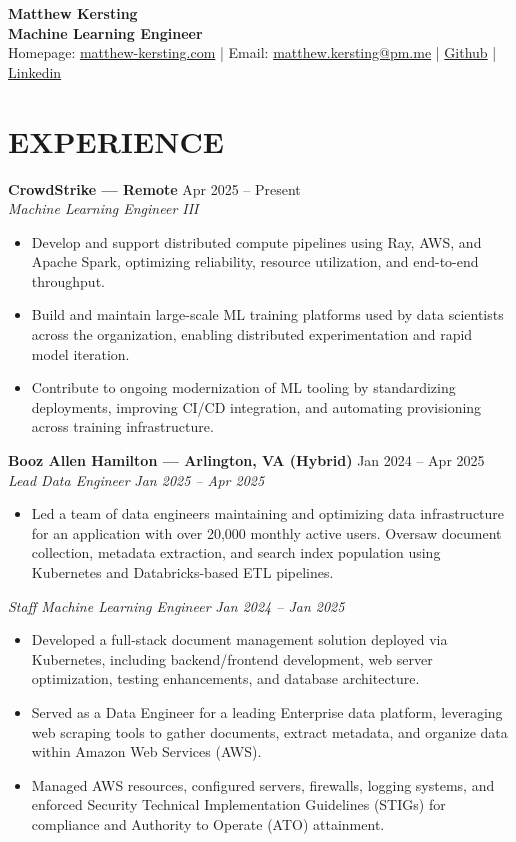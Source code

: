 \documentclass[10pt, letterpaper]{article}
\newcommand{\company}[2]{\textbf{#1} \hfill #2 \\[-1pt]}
\newcommand{\role}[1]{\textit{#1}}
\newcommand{\rolespan}[2]{\textit{#1} \hfill \textit{#2}}
\begin{document}
{\LARGE\textbf{Matthew Kersting}} \\[1pt]
\textbf{Machine Learning Engineer} \\[4pt]
Homepage: \href{https://matthew-kersting.com}{matthew-kersting.com} \quad|\quad
Email: \href{mailto:matthew.kersting@pm.me}{matthew.kersting@pm.me} \quad|\quad
\href{https://github.com/matthew-kersting}{Github} \quad|\quad
\href{https://www.linkedin.com/in/matthew-kersting-066289109/}{Linkedin}

\section*{EXPERIENCE}

\company{CrowdStrike --- Remote}{Apr 2025 -- Present}
\role{Machine Learning Engineer III}
\begin{itemize}
    \item Develop and support distributed compute pipelines using Ray, AWS, and Apache Spark, optimizing reliability, resource utilization, and end-to-end throughput.
    \item Build and maintain large-scale ML training platforms used by data scientists across the organization, enabling distributed experimentation and rapid model iteration.
    \item Contribute to ongoing modernization of ML tooling by standardizing deployments, improving CI/CD integration, and automating provisioning across training infrastructure.
\end{itemize}

\vspace{5pt}
\company{Booz Allen Hamilton --- Arlington, VA (Hybrid)}{Jan 2024 -- Apr 2025}
\rolespan{Lead Data Engineer}{Jan 2025 -- Apr 2025}
\begin{itemize}
    \item Led a team of data engineers maintaining and optimizing data infrastructure for an application with over 20,000 monthly active users. Oversaw document collection, metadata extraction, and search index population using Kubernetes and Databricks-based ETL pipelines.
\end{itemize}
\vspace{1pt}
\rolespan{Staff Machine Learning Engineer}{Jan 2024 -- Jan 2025}
\begin{itemize}
    \item Developed a full-stack document management solution deployed via Kubernetes, including backend/frontend development, web server optimization, testing enhancements, and database architecture.
    \item Served as a Data Engineer for a leading Enterprise data platform, leveraging web scraping tools to gather documents, extract metadata, and organize data within Amazon Web Services (AWS).
    \item Managed AWS resources, configured servers, firewalls, logging systems, and enforced Security Technical Implementation Guidelines (STIGs) for compliance and Authority to Operate (ATO) attainment.
\end{itemize}
\end{document}
